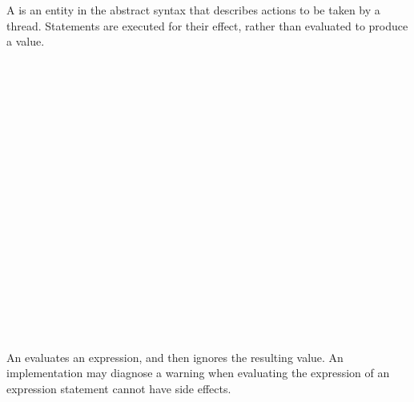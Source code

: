 
A  is an entity in the abstract syntax that describes actions to be taken by a thread.
Statements are executed for their effect, rather than evaluated to produce a value.

\begin{Syntax}
	 \\
		 \\
		\SynOr {} \\
		\SynOr {} \\
		\SynOr {} \\
		\SynOr {} \\
		\SynOr {} \\
		\SynOr {} \\
		\SynOr {} \\
		\SynOr {} \\
		\SynOr {} \\
		\SynOr {} \\
		\SynOr {} \\
		\SynOr {} \\
		\SynOr {} \\
		\SynOr {} \\
\end{Syntax}


\begin{Syntax}
	 \\
		 \code{;}
\end{Syntax}

An  evaluates an expression, and then ignores the resulting value.
An implementation may diagnose a warning when evaluating the expression of an expression statement cannot have side effects.

\begin{Checking}

 \\

\end{Checking}

